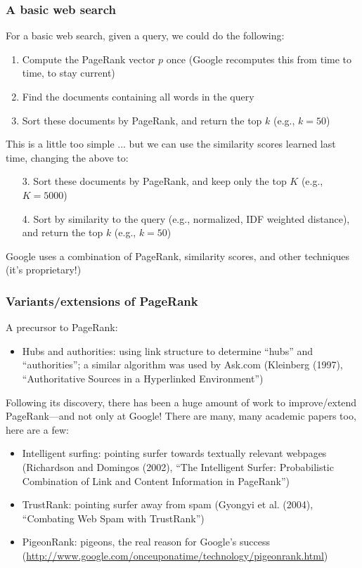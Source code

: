 \documentclass[mathserif]{beamer}
\def\red{\color[rgb]{0.8,0,0}}
\begin{document}
\begin{frame}
\frametitle{A basic web search}
\smallskip
For a basic web search, given a query, we could do the 
following:
\begin{enumerate}
\item Compute the PageRank vector $p$ {\red once} 
(Google recomputes this from time to time, to stay current)
\item Find the documents containing all words in the query
\item {\red Sort} these documents {\red by PageRank}, and
return the top $k$ (e.g., $k=50$) 
\end{enumerate}

\bigskip
This is a little too simple ... but we can use
the {\red similarity scores} learned last time,
changing the above to:
\begin{itemize}
\item[3.] Sort these documents by PageRank, and keep only the 
top $K$ (e.g., $K=5000$)
\item[4.] {\red Sort by similarity} to the query 
(e.g., normalized, IDF weighted distance), 
and return the top $k$ (e.g., $k=50$)
\end{itemize}

\bigskip
Google uses a combination of PageRank, similarity scores,
and other techniques (it's proprietary!)
\end{frame}

\begin{frame}
\frametitle{Variants/extensions of PageRank}
\smallskip
A precursor to PageRank:
\begin{itemize}
\item {\red Hubs and authorities}: using link structure to determine
``hubs'' and ``authorities''; a similar algorithm was used
by Ask.com
{\scriptsize(Kleinberg (1997), ``Authoritative Sources in a Hyperlinked Environment'')}
\end{itemize}

\smallskip
\smallskip
Following its discovery, there has been a huge amount of work 
to improve/extend PageRank---and not only at Google! There are many,
many academic papers too, here are a few:
\begin{itemize}
\item {\red Intelligent surfing}: pointing surfer towards textually
relevant webpages
{\scriptsize (Richardson and Domingos (2002), ``The Intelligent Surfer: 
Probabilistic Combination of Link and Content Information in PageRank'')}
\item {\red TrustRank}: pointing surfer away from spam
{\scriptsize (Gyongyi et al. (2004), ``Combating Web Spam with TrustRank'')}
\item {\red PigeonRank}: pigeons, the real reason for Google's success
{\scriptsize(\url{http://www.google.com/onceuponatime/technology/pigeonrank.html})}
\end{itemize}
\end{frame}
\end{document}
